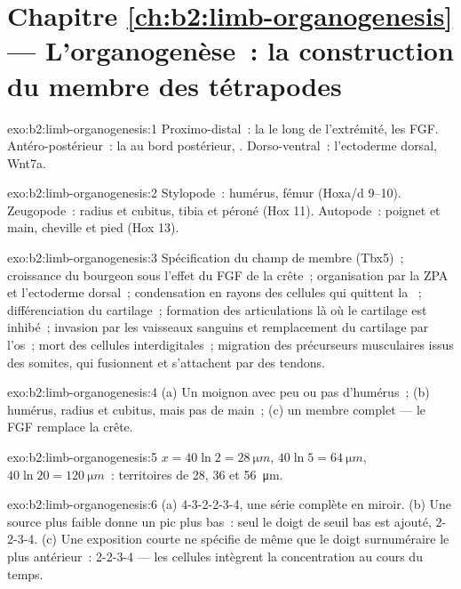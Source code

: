 \section*{Chapitre \ref{ch:b2:limb-organogenesis} --- L'organogenèse~: la construction du membre des tétrapodes}

\begin{solution}{exo:b2:limb-organogenesis:1}
Proximo-distal~: la  le long de l'extrémité,
les FGF. Antéro-postérieur~: la  au bord
postérieur, . Dorso-ventral~: l'ectoderme dorsal, Wnt7a.
\end{solution}

\begin{solution}{exo:b2:limb-organogenesis:2}
Stylopode~: humérus, fémur (Hoxa/d 9--10). Zeugopode~: radius et
cubitus, tibia et péroné (Hox 11). Autopode~: poignet et main, cheville
et pied (Hox 13).
\end{solution}

\begin{solution}{exo:b2:limb-organogenesis:3}
Spécification du champ de membre (Tbx5)~; croissance du bourgeon sous
l'effet du FGF de la crête~; organisation par la ZPA et l'ectoderme
dorsal~; condensation en rayons des cellules qui quittent la ~; différenciation du cartilage~; formation des articulations
là où le cartilage est inhibé~; invasion par les vaisseaux sanguins et
remplacement du cartilage par l'os~; mort des cellules interdigitales~;
migration des précurseurs musculaires issus des somites, qui fusionnent
et s'attachent par des tendons.
\end{solution}

\begin{solution}{exo:b2:limb-organogenesis:4}
(a) Un moignon avec peu ou pas d'humérus~; (b) humérus, radius et cubitus,
mais pas de main~; (c) un membre complet --- le FGF remplace la crête.
\end{solution}

\begin{solution}{exo:b2:limb-organogenesis:5}
$x = 40\ln 2 = \qty{28}{\micro m}$, $40\ln 5 = \qty{64}{\micro m}$,
$40\ln 20 = \qty{120}{\micro m}$~: territoires de 28, 36 et
\qty{56}{\micro m}.
\end{solution}

\begin{solution}{exo:b2:limb-organogenesis:6}
(a) 4-3-2-2-3-4, une série complète en miroir. (b) Une source plus
faible donne un pic plus bas~: seul le doigt de seuil bas est ajouté,
2-2-3-4. (c) Une exposition courte ne spécifie de même que le doigt
surnuméraire le plus antérieur~: 2-2-3-4 --- les cellules intègrent la
concentration au cours du temps.
\end{solution}

